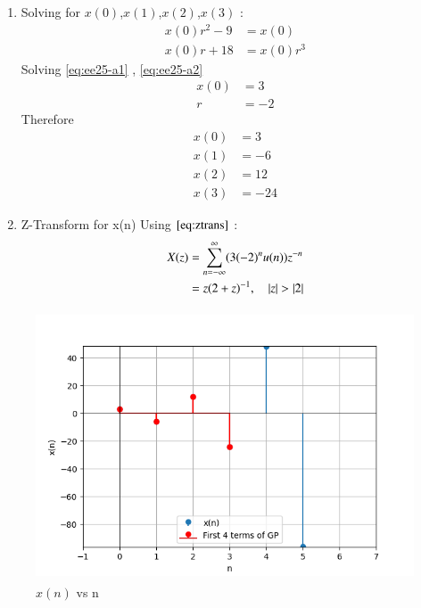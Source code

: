 \documentclass[journal,12pt,onecolumn]{IEEEtran}
\theoremstyle{remark}
\begin{document}
\begin{enumerate}
    \item Solving for $x(0)$,$x(1)$,$x(2)$,$x(3)$ :
   \begin{align}
x(0)r^2 - 9 &= x(0) \label{eq:ee25-a1}\\
x(0)r + 18 &= x(0)r^3\label{eq:ee25-a2}
\end{align}
Solving  \eqref{eq:ee25-a1} , \eqref{eq:ee25-a2}
\begin{align}
    x(0) &= 3\\
    r &= -2
\end{align}
Therefore 
\begin{align}
    x(0) &= 3\\
    x(1) &= -6\\
    x(2) &= 12\\
    x(3) &= -24
     \end{align}

    \item Z-Transform for x(n) 
    Using $\eqref{eq:ztrans}$ :
    \begin{align}
    X(z) &= \sum_{n=-\infty}^{\infty}(3(-2)^nu(n))z^{-n} \\
    &= z(2+z)^{-1} ,\quad \left\vert z\right\vert>\left\vert2\right\vert 
    \end{align}
    
\end{enumerate}
    \begin{figure}[!ht]
    \centering
\graphicspath{ {figs/} }
\includegraphics[width=12cm, height=8cm]{graph_1}
\caption{ $x(n)$ vs n }
\label{graph:ee25-ag2}
\end{figure}
\vspace{0.5cm}







 
\end{document}
